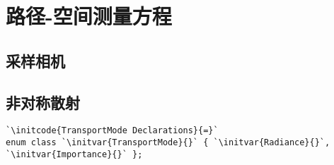 \section{路径-空间测量方程}\label{sec:路径-空间测量方程}

\subsection{采样相机}\label{sub:采样相机2}
\subsection{非对称散射}\label{sub:非对称散射}
\begin{lstlisting}
`\initcode{TransportMode Declarations}{=}`
enum class `\initvar{TransportMode}{}` { `\initvar{Radiance}{}`, `\initvar{Importance}{}` };
\end{lstlisting}